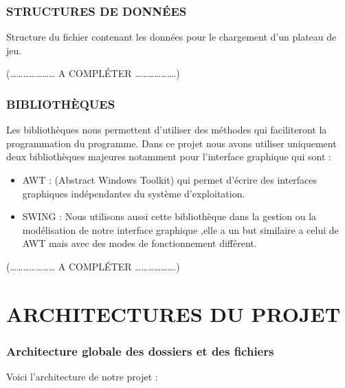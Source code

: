 \documentclass[a4paper]{article} %
\begin{document}
\subsubsection{STRUCTURES DE DONNÉES }
Structure du fichier contenant les données pour le chargement d'un plateau de jeu.\label{structFichier}

(………………… A COMPLÉTER ……………….)

\subsubsection{BIBLIOTHÈQUES}
Les bibliothèques nous permettent d'utiliser des méthodes qui faciliteront la programmation du programme.
Dans ce projet nous avons utiliser uniquement deux bibliothèques majeures notamment pour l'interface graphique qui sont : \begin{itemize}
\item AWT : (Abstract Windows Toolkit) qui permet d'écrire des interfaces graphiques indépendantes du système d'exploitation.
\item SWING : Nous utilisons aussi cette bibliothèque dans la gestion ou la modélisation de notre interface graphique ,elle a un but similaire a celui de AWT mais avec des modes de fonctionnement différent. 
\end{itemize}
(………………… A COMPLÉTER ……………….)

\section{ARCHITECTURES DU PROJET }
\subsubsection{ Architecture globale des dossiers et des fichiers}
Voici l'architecture de notre projet :



\makeatletter
\newcount\dirtree@lvl
\newcount\dirtree@plvl
\newcount\dirtree@clvl
\def\dirtree@growth{%
  \ifnum\tikznumberofcurrentchild=1\relax
  \global\advance\dirtree@plvl by 1
  \expandafter\xdef\csname dirtree@p@\the\dirtree@plvl\endcsname{\the\dirtree@lvl}
  \fi
  \global\advance\dirtree@lvl by 1\relax
  \dirtree@clvl=\dirtree@lvl
  \advance\dirtree@clvl by -\csname dirtree@p@\the\dirtree@plvl\endcsname
  \pgf@xa=0,5cm\relax
  \pgf@ya=-0,45cm\relax
  \pgf@ya=\dirtree@clvl\pgf@ya
  \pgftransformshift{\pgfqpoint{\the\pgf@xa}{\the\pgf@ya}}%
  \ifnum\tikznumberofcurrentchild=\tikznumberofchildren
  \global\advance\dirtree@plvl by -1
  \fi
}
\end{document}
